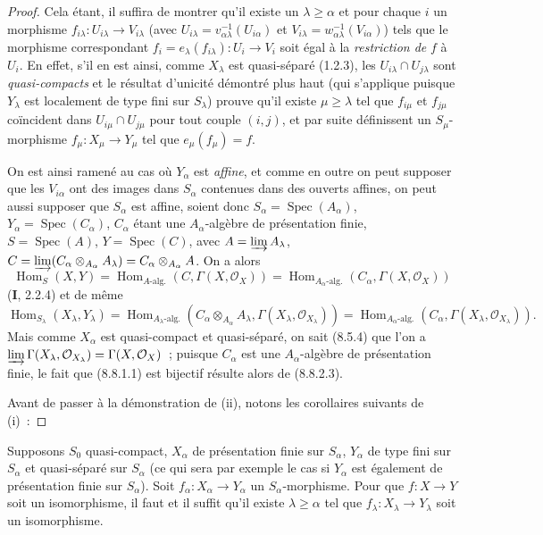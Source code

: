 \begin{proof}
Cela étant, il suffira de montrer qu'il existe un $\lambda\geq\alpha$ et pour
chaque $i$ un morphisme $f_{i\lambda}:U_{i\lambda}\to V_{i\lambda}$ (avec
$U_{i\lambda}=v_{\alpha\lambda}^{-1}(U_{i\alpha})$ et
$V_{i\lambda}=w_{\alpha\lambda}^{-1}(V_{i\alpha})$) tels que le morphisme
correspondant $f_i=e_\lambda(f_{i\lambda}):U_i\to V_i$ soit égal à la
\emph{restriction de} $f$ à $U_i$. En effet, s'il en est ainsi, comme
$X_\lambda$ est quasi-séparé (1.2.3), les
$U_{i\lambda}\cap U_{j\lambda}$ sont \emph{quasi-compacts} et le résultat
d'unicité démontré plus haut (qui s'applique puisque $Y_\lambda$ est
localement de type fini sur $S_\lambda$) prouve qu'il existe
$\mu\geq\lambda$ tel que $f_{i\mu}$ et $f_{j\mu}$ coïncident dans
$U_{i\mu}\cap U_{j\mu}$ pour tout couple $(i,j)$, et par suite définissent un
$S_\mu$-morphisme $f_\mu:X_\mu\to Y_\mu$ tel que $e_\mu(f_\mu)=f$.

On est ainsi ramené au cas où $Y_\alpha$ est \emph{affine}, et comme en outre
on peut supposer que les $V_{i\alpha}$ ont des images dans $S_\alpha$
contenues dans des ouverts affines, on peut aussi supposer que $S_\alpha$ est
affine, soient donc $S_\alpha=\operatorname{Spec}(A_\alpha)$,
$Y_\alpha=\operatorname{Spec}(C_\alpha)$, $C_\alpha$ étant une
$A_\alpha$-algèbre de présentation finie, $S=\operatorname{Spec}(A)$,
$Y=\operatorname{Spec}(C)$, avec $A=\varinjlim A_\lambda$,
$C=\varinjlim(C_\alpha\otimes_{A_\alpha}A_\lambda)=
C_\alpha\otimes_{A_\alpha}A$. On a alors
\[
\operatorname{Hom}_S(X,Y)=
\operatorname{Hom}_{A\text{-alg.}}(C,\Gamma(X,\mathcal O_X))=
\operatorname{Hom}_{A_\alpha\text{-alg.}}(C_\alpha,\Gamma(X,\mathcal O_X))
\]
(\textbf{I}, 2.2.4) et de même
\[
\operatorname{Hom}_{S_\lambda}(X_\lambda,Y_\lambda)=
\operatorname{Hom}_{A_\lambda\text{-alg.}}
(C_\alpha\otimes_{A_\alpha}A_\lambda,\Gamma(X_\lambda,\mathcal O_{X_\lambda}))=
\operatorname{Hom}_{A_\alpha\text{-alg.}}
(C_\alpha,\Gamma(X_\lambda,\mathcal O_{X_\lambda})).
\]
Mais comme $X_\alpha$ est quasi-compact et quasi-séparé, on sait (8.5.4) que
l'on a
$\varinjlim\Gamma(X_\lambda,\mathcal O_{X_\lambda})=
\Gamma(X,\mathcal O_X)$~; puisque $C_\alpha$ est une $A_\alpha$-algèbre de
présentation finie, le fait que (8.8.1.1) est bijectif résulte alors de
(8.8.2.3).

Avant de passer à la démonstration de (ii), notons les corollaires suivants de
(i)~:
\end{proof}

\begin{corollary}[8.8.2.4]
\label{IV.8.8.2.4-fr}
Supposons $S_0$ quasi-compact, $X_\alpha$ de présentation finie sur $S_\alpha$,
$Y_\alpha$ de type fini sur $S_\alpha$ et quasi-séparé sur $S_\alpha$ \textup{(ce qui
sera par exemple le cas si $Y_\alpha$ est également}
\textup{de présentation finie sur $S_\alpha$)}. Soit
$f_\alpha:X_\alpha\to Y_\alpha$ un $S_\alpha$-morphisme. Pour que
$f:X\to Y$ soit un isomorphisme, il faut et il suffit qu'il existe
$\lambda\geq\alpha$ tel que $f_\lambda:X_\lambda\to Y_\lambda$ soit un
isomorphisme.
\end{corollary}


